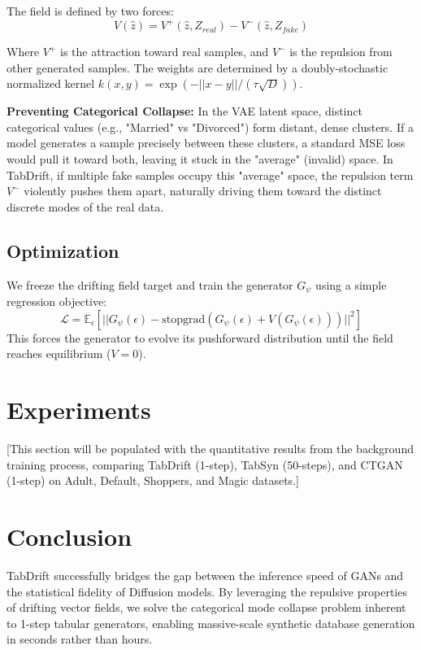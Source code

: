 \documentclass[10pt,journal,compsoc]{IEEEtran}
\begin{document}
The field is defined by two forces:
\begin{equation}
    V(\hat{z}) = V^+(\hat{z}, Z_{real}) - V^-(\hat{z}, Z_{fake})
\end{equation}

Where $V^+$ is the attraction toward real samples, and $V^-$ is the repulsion from other generated samples. The weights are determined by a doubly-stochastic normalized kernel $k(x, y) = \exp(-||x-y|| / (\tau \sqrt{D}))$.

\textbf{Preventing Categorical Collapse:} In the VAE latent space, distinct categorical values (e.g., "Married" vs "Divorced") form distant, dense clusters. If a model generates a sample precisely between these clusters, a standard MSE loss would pull it toward both, leaving it stuck in the "average" (invalid) space. In TabDrift, if multiple fake samples occupy this "average" space, the repulsion term $V^-$ violently pushes them apart, naturally driving them toward the distinct discrete modes of the real data.

\subsection{Optimization}
We freeze the drifting field target and train the generator $G_\psi$ using a simple regression objective:
\begin{equation}
    \mathcal{L} = \mathbb{E}_{\epsilon} \left[ || G_\psi(\epsilon) - \text{stopgrad}(G_\psi(\epsilon) + V(G_\psi(\epsilon))) ||^2 \right]
\end{equation}
This forces the generator to evolve its pushforward distribution until the field reaches equilibrium ($V=0$).

\section{Experiments}
[This section will be populated with the quantitative results from the background training process, comparing TabDrift (1-step), TabSyn (50-steps), and CTGAN (1-step) on Adult, Default, Shoppers, and Magic datasets.]

\section{Conclusion}
TabDrift successfully bridges the gap between the inference speed of GANs and the statistical fidelity of Diffusion models. By leveraging the repulsive properties of drifting vector fields, we solve the categorical mode collapse problem inherent to 1-step tabular generators, enabling massive-scale synthetic database generation in seconds rather than hours.
\end{document}
